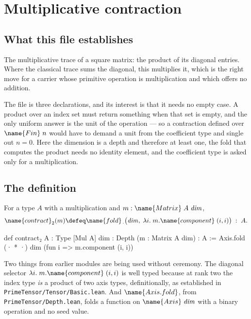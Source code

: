 
\section{Multiplicative contraction}
\label{Tensor:Contract:sec}


\subsection*{What this file establishes}

The multiplicative trace of a square matrix: the product of its diagonal
entries.  Where the classical trace sums the diagonal, this multiplies it,
which is the right move for a carrier whose primitive operation is
multiplication and which offers no addition.

The file is three declarations, and its interest is that it needs no empty
case.  A product over an index set must return something when that set is
empty, and the only uniform answer is the unit of the operation --- so a
contraction defined over $\name{Fin}\;n$ would have to demand a unit from the
coefficient type and single out $n = 0$.  Here the dimension is a depth and
therefore at least one, the fold that computes the product needs no identity
element, and the coefficient type is asked only for a multiplication.

\subsection{The definition}

\begin{definition}
\label{Tensor:Contract:def:contract}
For a type $A$ with a multiplication and
$m : \name{Matrix}\;A\;\mathit{dim}$,
\[
  \name{contract}_2(m) \defeq
    \name{fold}_{\,\cdot}\bigl(\mathit{dim},\;
      \lambda i.\; m.\name{component}\;(i,i)\bigr) \;:\; A.
\]
\end{definition}

\begin{leancode}
def contract₂ {A : Type} [Mul A] {dim : Depth} (m : Matrix A dim) : A :=
  Axis.fold (· * ·) dim (fun i => m.component (i, i))
\end{leancode}

Two things from earlier modules are being used without ceremony.  The
diagonal selector $\lambda i.\; m.\name{component}\;(i,i)$ is well typed
because at rank two the index type \emph{is} a product of two axis types,
definitionally, as established in
\texttt{PrimeTensor/Tensor/Basic.lean}.  And
$\name{Axis.fold}$, from \texttt{PrimeTensor/Depth.lean}, folds a function on
$\name{Axis}\;\mathit{dim}$ with a binary operation and no seed value.

